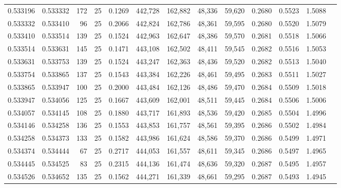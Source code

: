 \begin{tabular}{rrrrrrrrrrrrr}
0.533196 & 0.533332 &   172 &  25 &                                     0.1269 & 442,728 & 162,882 &  48,336 &  59,620 & 0.2680 & 0.5523 & 1.5088 \\
0.533332 & 0.533410 &    96 &  25 &                                     0.2066 & 442,824 & 162,786 &  48,361 &  59,595 & 0.2680 & 0.5520 & 1.5079 \\
0.533410 & 0.533514 &   139 &  25 &                                     0.1524 & 442,963 & 162,647 &  48,386 &  59,570 & 0.2681 & 0.5518 & 1.5066 \\
0.533514 & 0.533631 &   145 &  25 &                                     0.1471 & 443,108 & 162,502 &  48,411 &  59,545 & 0.2682 & 0.5516 & 1.5053 \\
0.533631 & 0.533753 &   139 &  25 &                                     0.1524 & 443,247 & 162,363 &  48,436 &  59,520 & 0.2682 & 0.5513 & 1.5040 \\
0.533754 & 0.533865 &   137 &  25 &                                     0.1543 & 443,384 & 162,226 &  48,461 &  59,495 & 0.2683 & 0.5511 & 1.5027 \\
0.533865 & 0.533947 &   100 &  25 &                                     0.2000 & 443,484 & 162,126 &  48,486 &  59,470 & 0.2684 & 0.5509 & 1.5018 \\
0.533947 & 0.534056 &   125 &  25 &                                     0.1667 & 443,609 & 162,001 &  48,511 &  59,445 & 0.2684 & 0.5506 & 1.5006 \\
0.534057 & 0.534145 &   108 &  25 &                                     0.1880 & 443,717 & 161,893 &  48,536 &  59,420 & 0.2685 & 0.5504 & 1.4996 \\
0.534146 & 0.534258 &   136 &  25 &                                     0.1553 & 443,853 & 161,757 &  48,561 &  59,395 & 0.2686 & 0.5502 & 1.4984 \\
0.534258 & 0.534373 &   133 &  25 &                                     0.1582 & 443,986 & 161,624 &  48,586 &  59,370 & 0.2686 & 0.5499 & 1.4971 \\
0.534374 & 0.534444 &    67 &  25 &                                     0.2717 & 444,053 & 161,557 &  48,611 &  59,345 & 0.2686 & 0.5497 & 1.4965 \\
0.534445 & 0.534525 &    83 &  25 &                                     0.2315 & 444,136 & 161,474 &  48,636 &  59,320 & 0.2687 & 0.5495 & 1.4957 \\
0.534526 & 0.534652 &   135 &  25 &                                     0.1562 & 444,271 & 161,339 &  48,661 &  59,295 & 0.2687 & 0.5493 & 1.4945 \\

\end{tabular}

